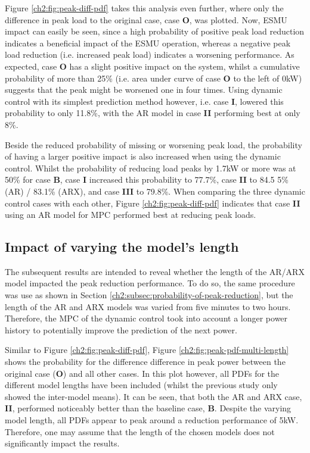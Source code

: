 

Figure \ref{ch2:fig:peak-diff-pdf} takes this analysis even further, where only the difference in peak load to the original case, case \textbf{O}, was plotted.
Now, ESMU impact can easily be seen, since a high probability of positive peak load reduction indicates a beneficial impact of the ESMU operation, whereas a negative peak load reduction (i.e. increased peak load) indicates a worsening performance.
As expected, case \textbf{O} has a slight positive impact on the system, whilst a cumulative probability of more than 25\% (i.e. area under curve of case \textbf{O} to the left of 0kW) suggests that the peak might be worsened one in four times.
Using dynamic control with its simplest prediction method however, i.e. case \textbf{I}, lowered this probability to only 11.8\%, with the AR model in case \textbf{II} performing best at only 8\%.

Beside the reduced probability of missing or worsening peak load, the probability of having a larger positive impact is also increased when using the dynamic control.
Whilst the probability of reducing load peaks by 1.7kW or more was at 50\% for case \textbf{B}, case \textbf{I} increased this probability to 77.7\%, case \textbf{II} to 84.5 5\% (AR) / 83.1\% (ARX), and case \textbf{III} to 79.8\%.
When comparing the three dynamic control cases with each other, Figure \ref{ch2:fig:peak-diff-pdf} indicates that case \textbf{II} using an AR model for MPC performed best at reducing peak loads.

\subsection{Impact of varying the model's length}

The subsequent results are intended to reveal whether the length of the AR/ARX model impacted the peak reduction performance.
To do so, the same procedure was use as shown in Section \ref{ch2:subsec:probability-of-peak-reduction}, but the length of the AR and ARX models was varied from five minutes to two hours.
Therefore, the MPC of the dynamic control took into account a longer power history to potentially improve the prediction of the next power.



Similar to Figure \ref{ch2:fig:peak-diff-pdf}, Figure \ref{ch2:fig:peak-pdf-multi-length} shows the probability for the difference difference in peak power between the original case (\textbf{O}) and all other cases.
In this plot however, all PDFs for the different model lengths have been included (whilst the previous study only showed the inter-model means).
It can be seen, that both the AR and ARX case, \textbf{II}, performed noticeably better than the baseline case, \textbf{B}.
Despite the varying model length, all PDFs appear to peak around a reduction performance of 5kW.
Therefore, one may assume that the length of the chosen models does not significantly impact the results.

